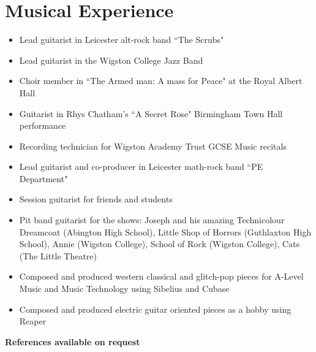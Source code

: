 \documentclass{article}
\begin{document}
\section{Musical Experience}
\begin{itemize}[noitemsep]

\renewcommand{\labelitemi}{$\square$}
\item Lead guitarist in Leicester alt-rock band ``The Scrubs"
\item Lead guitarist in the Wigston College Jazz Band
\item Choir member in ``The Armed man: A mass for Peace" at the Royal Albert Hall
\item Guitarist in Rhys Chatham's ``A Secret Rose" Birmingham Town Hall performance
\item Recording technician for Wigston Academy Trust GCSE Music recitals
\item Lead guitarist and co-producer in Leicester math-rock band ``PE Department"
\item Session guitarist for friends and students
\item Pit band guitarist for the shows: Joseph and his amazing Technicolour Dreamcoat (Abington High School),
Little Shop of Horrors (Guthlaxton High School), Annie (Wigston College), School of Rock (Wigston College), Cats (The Little Theatre)
\item Composed and produced western classical and glitch-pop pieces for A-Level Music and Music Technology using Sibelius and Cubase
\item Composed and produced electric guitar oriented pieces as a hobby using Reaper

\end{itemize}

\begin{center}

\vskip 0.5cm
\textbf{References available on request}

\end{center}
\end{document}
